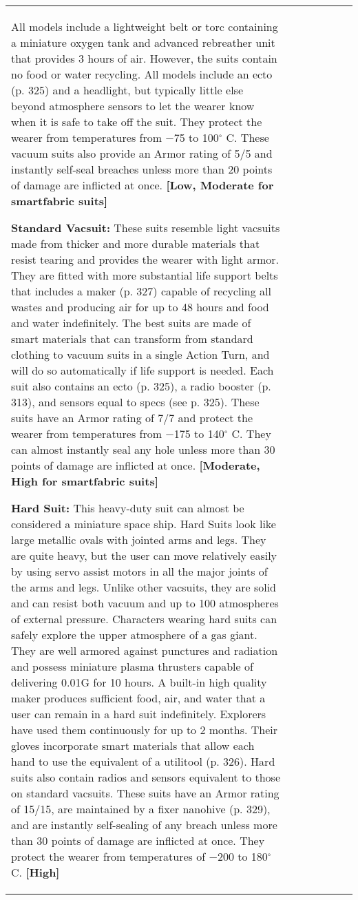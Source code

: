 \begin{tabular}{|l|l|l|l|l|l|l|}
All models include a lightweight belt or torc containing a miniature oxygen tank and advanced rebreather unit that provides 3 hours of air. However, the suits contain no food or water recycling. All models include an ecto (p. 325) and a headlight, but typically little else beyond atmosphere sensors to let the wearer know when it is safe to take off the suit. They protect the wearer from temperatures from $-$75 to 100$^{\circ}$ C. These vacuum suits also provide an Armor rating of 5/5 and instantly self-seal breaches unless more than 20 points of damage are inflicted at once. \textbf{[Low, Moderate for smartfabric suits]} 

\textbf{Standard Vacsuit:} These suits resemble light vacsuits made from thicker and more durable materials that resist tearing and provides the wearer with light armor. They are fitted with more substantial life support belts that includes a maker (p. 327) capable of recycling all wastes and producing air for up to 48 hours and food and water indefinitely. The best suits are made of smart materials that can transform from standard clothing to vacuum suits in a single Action Turn, and will do so automatically if life support is needed. Each suit also contains an ecto (p. 325), a radio booster (p. 313), and sensors equal to specs (see p. 325). These suits have an Armor rating of 7/7 and protect the wearer from temperatures from $-$175 to 140$^{\circ}$ C. They can almost instantly seal any hole unless more than 30 points of damage are inflicted at once. \textbf{[Moderate, High for smartfabric suits]} 

\textbf{Hard Suit:} This heavy-duty suit can almost be considered a miniature space ship. Hard Suits look like large metallic ovals with jointed arms and legs. They are quite heavy, but the user can move relatively easily by using servo assist motors in all the major joints of the arms and legs. Unlike other vacsuits, they are solid and can resist both vacuum and up to 100 atmospheres of external pressure. Characters wearing hard suits can safely explore the upper atmosphere of a gas giant. They are well armored against punctures and radiation and possess miniature plasma thrusters capable of delivering 0.01G for 10 hours. A built-in high quality maker produces sufficient food, air, and water that a user can remain in a hard suit indefinitely. Explorers have used them continuously for up to 2 months. Their gloves incorporate smart materials that allow each hand to use the equivalent of a utilitool (p. 326). Hard suits also contain radios and sensors equivalent to those on standard vacsuits. These suits have an Armor rating of 15/15, are maintained by a fixer nanohive (p. 329), and are instantly self-sealing of any breach unless more than 30 points of damage are inflicted at once. They protect the wearer from temperatures of $-$200 to 180$^{\circ}$ C. \textbf{[High]} 




\end{tabular}
